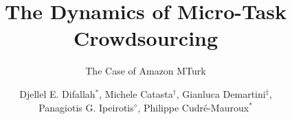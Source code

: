 \documentclass{sig-alternate}
\begin{document}
%

\title{The Dynamics of Micro-Task Crowdsourcing}
\subtitle{The Case of Amazon MTurk}


\author{
\alignauthor
Djellel E. Difallah$^*$, Michele Catasta$^\dagger$, Gianluca Demartini$^\ddagger$, \\  Panagiotis G. Ipeirotis$^\diamond$, Philippe Cudr\'e-Mauroux$^*$\\
       \\
       \\
       \\
}
\end{document}
